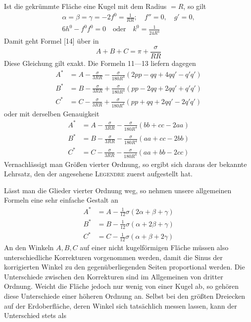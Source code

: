 \indent Ist die gekrümmte Fläche eine Kugel mit dem Radius \(=R\), so gilt
\[
\begin{gathered}
\alpha=\beta=\gamma=-2f^0=\frac{1}{RR};\quad f''=0,\quad g'=0,\\
6h^0-f^0f^0=0\quad\text{oder}\quad k^0=\frac{1}{24R^4}
\end{gathered}
\]
Damit geht Formel [14] über in
\[
A+B+C=\pi+\frac{\sigma}{RR}
\]
Diese Gleichung gilt exakt. Die Formeln 11—13 liefern dagegen
\[
\begin{aligned}
A^*&=A-\frac{\sigma}{3RR}-\frac{\sigma}{180R^4}(2pp-qq+4qq'-q'q')\\
B^*&=B-\frac{\sigma}{3RR}+\frac{\sigma}{180R^4}(pp-2qq+2qq'+q'q')\\
C^*&=C-\frac{\sigma}{3RR}+\frac{\sigma}{180R^4}(pp+qq+2qq'-2q'q')
\end{aligned}
\]
oder mit derselben Genauigkeit
\[
\begin{aligned}
A^*&=A-\frac{\sigma}{3RR}-\frac{\sigma}{180R^4}(bb+cc-2aa)\\
B^*&=B-\frac{\sigma}{3RR}-\frac{\sigma}{180R^4}(aa+cc-2bb)\\
C^*&=C-\frac{\sigma}{3RR}-\frac{\sigma}{180R^4}(aa+bb-2cc)
\end{aligned}
\]
Vernachlässigt man Größen vierter Ordnung, so ergibt sich daraus der bekannte Lehrsatz, den der angesehene \textsc{Legendre} zuerst aufgestellt hat.

\indent Lässt man die Glieder vierter Ordnung weg, so nehmen unsere allgemeinen Formeln eine sehr einfache Gestalt an
\[
\begin{aligned}
A^*&=A-\tfrac{1}{12}\sigma(2\alpha+\beta+\gamma)\\
B^*&=B-\tfrac{1}{12}\sigma(\alpha+2\beta+\gamma)\\
C^*&=C-\tfrac{1}{12}\sigma(\alpha+\beta+2\gamma)
\end{aligned}
\]
An den Winkeln \(A,B,C\) auf einer nicht kugelförmigen Fläche müssen also unterschiedliche Korrekturen vorgenommen werden, damit die Sinus der korrigierten Winkel zu den gegenüberliegenden Seiten proportional werden. Die Unterschiede zwischen den Korrekturen sind im Allgemeinen von dritter Ordnung. Weicht die Fläche jedoch nur wenig von einer Kugel ab, so gehören diese Unterschiede einer höheren Ordnung an. Selbst bei den größten Dreiecken auf der Erdoberfläche, deren Winkel sich tatsächlich messen lassen, kann der Unterschied stets als
